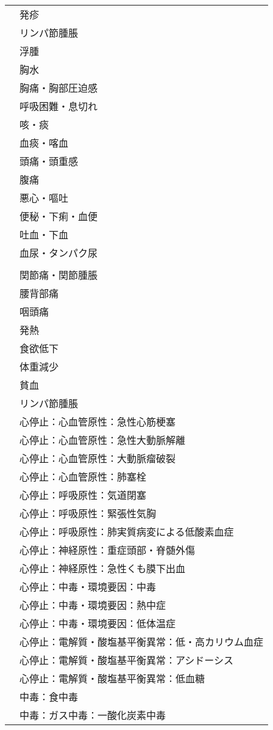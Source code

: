 \begin{xltabular}{\linewidth}{XX}
 & 発疹 \\
 & リンパ節腫脹 \\
 & 浮腫 \\
 & 胸水 \\
 & 胸痛・胸部圧迫感 \\
 & 呼吸困難・息切れ \\
 & 咳・痰 \\
 & 血痰・喀血 \\
 & 頭痛・頭重感 \\
 & 腹痛 \\
 & 悪心・嘔吐 \\
 & 便秘・下痢・血便 \\
 & 吐血・下血 \\
 & 血尿・タンパク尿 \\
 &  \\
 & 関節痛・関節腫脹 \\
 & 腰背部痛 \\
 & 咽頭痛 \\
 & 発熱 \\
 & 食欲低下 \\
 & 体重減少 \\
 & 貧血 \\
 & リンパ節腫脹 \\
 & 心停止：心血管原性：急性心筋梗塞 \\
 & 心停止：心血管原性：急性大動脈解離 \\
 & 心停止：心血管原性：大動脈瘤破裂 \\
 & 心停止：心血管原性：肺塞栓 \\
 & 心停止：呼吸原性：気道閉塞 \\
 & 心停止：呼吸原性：緊張性気胸 \\
 & 心停止：呼吸原性：肺実質病変による低酸素血症 \\
 & 心停止：神経原性：重症頭部・脊髄外傷 \\
 & 心停止：神経原性：急性くも膜下出血 \\
 & 心停止：中毒・環境要因：中毒 \\
 & 心停止：中毒・環境要因：熱中症 \\
 & 心停止：中毒・環境要因：低体温症 \\
 & 心停止：電解質・酸塩基平衡異常：低・高カリウム血症 \\
 & 心停止：電解質・酸塩基平衡異常：アシドーシス \\
 & 心停止：電解質・酸塩基平衡異常：低血糖 \\
 & 中毒：食中毒 \\
 & 中毒：ガス中毒：一酸化炭素中毒 \\

\end{xltabular}
